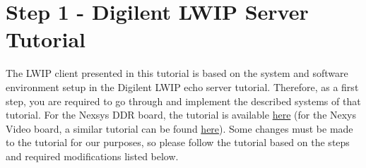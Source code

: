 \documentclass[11pt]{article}
\begin{document}
\section*{Step 1 - Digilent LWIP Server Tutorial}
The LWIP client presented in this tutorial is based on the system and software environment setup in the Digilent LWIP echo server tutorial. Therefore, as a first step, you are required to go through and implement the described systems of that tutorial. For the Nexsys DDR board, the tutorial is available \href{https://reference.digilentinc.com/learn/programmable-logic/tutorials/nexys-4-ddr-getting-started-with-microblaze-servers/start}{\color{blue}here} (for the Nexys Video board, a similar tutorial can be found \href{https://reference.digilentinc.com/learn/programmable-logic/tutorials/nexys-video-getting-started-with-microblaze-servers/start}{\color{blue}here}). Some changes must be made to the tutorial for our purposes, so please follow the tutorial based on the steps and required modifications listed below.
\end{document}
